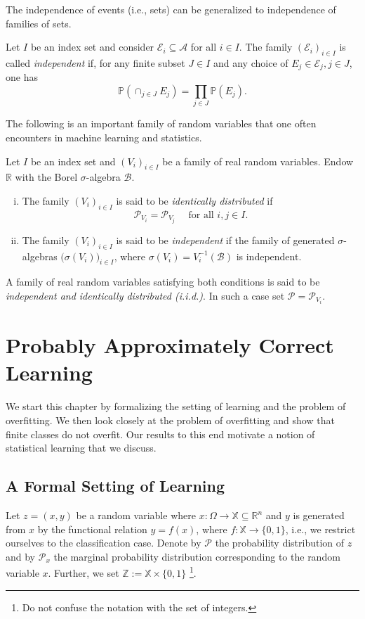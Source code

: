 The independence of events (i.e., sets) can be generalized to independence of
families of sets. 
\begin{definition}
        Let $I$ be an index set and consider $\mathcal{E}_i \subseteq \mathcal{A}$ for all $i \in I$.
        The family $(\mathcal{E}_i)_{i \in I}$ is called \emph{independent} if, for any finite subset 
        $J \in I$ and any choice of $E_j \in \mathcal{E}_j, j \in J$, one has 
        $$
        \mathbb{P}(\cap_{j \in J} E_j) = \prod_{j \in J} \mathbb{P}(E_j).
        $$
\end{definition}
The following is an important family of random variables that one often encounters 
in machine learning and statistics. 
\begin{definition}
	\label{def:iid}
	Let $I$ be an index set and $(V_i)_{i \in I}$ be a family of real random 
	variables. Endow $\mathbb{R}$ with the Borel $\sigma$-algebra $\mathcal{B}$.
	\begin{enumerate}[(i)]
		\item The family $(V_i)_{i \in I}$ is said to be \emph{identically distributed} if 
		$$\mathcal{P}_{V_i} = \mathcal{P}_{V_j} \quad \text{ for all } i, j \in I.$$
		\item The family $(V_i)_{i \in I}$ is said to be \emph{independent} if the 
		family of generated $\sigma$-algebras $\bigl(\sigma(V_i) \bigr)_{i\in I}$, where 
		$\sigma(V_i) = V_i^{-1}(\mathcal{B})$ is independent.
	\end{enumerate}
A family of real random variables satisfying both conditions is said to be
\emph{independent and identically distributed (i.i.d.)}.
In such a case set $\mathcal{P} = \mathcal{P}_{V_i}$. \end{definition}

\section{Probably Approximately Correct Learning}

We start this chapter by formalizing the setting of learning and the problem of
overfitting. We then look closely at the problem of overfitting and show that
finite classes do not overfit. Our results to this end motivate a notion of
statistical learning that we discuss.

\subsection{A Formal Setting of Learning}
Let $z = (x, y)$ be a random variable where $x: \Omega \to \mathbb{X} \subseteq \mathbb{R}^n$ and $y$
is generated from $x$ by the functional relation $y=f(x)$, where $f: \mathbb{X}
\to \{0,1\}$, i.e., we restrict ourselves to the classification case. Denote by
$\mathcal{P}$ the probability distribution of $z$ and by $\mathcal{P}_x$ the
marginal probability distribution corresponding to the random variable $x$.
Further, we set $\mathbb{Z} := \mathbb{X} \times \{0,1\}$ \footnote{Do not
confuse the notation with the set of integers.}.

